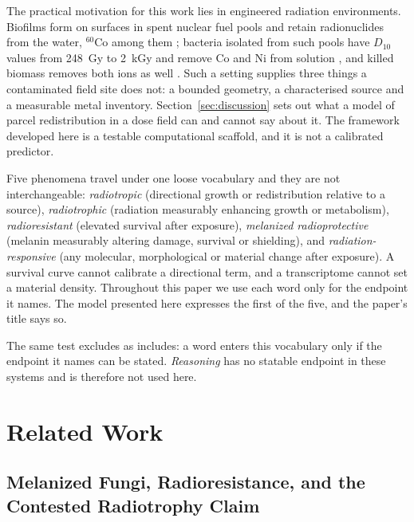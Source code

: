 \documentclass[11pt]{article}
\begin{document}
The practical motivation for this work lies in engineered radiation environments. Biofilms
form on surfaces in spent nuclear fuel pools and retain radionuclides from the water, $^{60}$Co
among them \cite{sarro2007}; bacteria isolated from such pools have $D_{10}$ values from 248~Gy
to 2~kGy and remove Co and Ni from solution \cite{karley2018}, and killed biomass removes both
ions as well \cite{karley2023}. Such a setting supplies three things a contaminated field site
does not: a bounded geometry, a characterised source and a measurable metal inventory.
Section~\ref{sec:discussion} sets out what a model of parcel redistribution in a dose field can
and cannot say about it. The framework developed here is a testable computational scaffold, and
it is not a calibrated predictor.

Five phenomena travel under one loose vocabulary and they are not interchangeable: \emph{radiotropic}
(directional growth or redistribution relative to a source), \emph{radiotrophic} (radiation
measurably enhancing growth or metabolism), \emph{radioresistant} (elevated survival after
exposure), \emph{melanized radioprotective} (melanin measurably altering damage, survival or
shielding), and \emph{radiation-responsive} (any molecular, morphological or material change after
exposure). A survival curve cannot calibrate a directional term, and a transcriptome cannot set a
material density. Throughout this paper we use each word only for the endpoint it names. The model
presented here expresses the first of the five, and the paper's title says so.

The same test excludes as includes: a word enters this vocabulary only if the endpoint it names can
be stated. \emph{Reasoning} has no statable endpoint in these systems and is therefore not used
here.

\section{Related Work}

\subsection{Melanized Fungi, Radioresistance, and the Contested Radiotrophy Claim}
\label{sec:melanin_radiotrophy}
\end{document}
